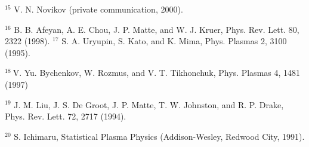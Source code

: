 \documentclass[oneside,onecolumn]{article}
\begin{document}
\begin{sloppypar}
${ }^{15}$ V. N. Novikov (private communication, 2000).

${ }^{16}$ B. B. Afeyan, A. E. Chou, J. P. Matte, and W. J. Kruer, Phys. Rev. Lett. 80, 2322 (1998). ${ }^{17}$ S. A. Uryupin, S. Kato, and K. Mima, Phys. Plasmas 2, 3100 (1995).

${ }^{18} \mathrm{~V}$. Yu. Bychenkov, W. Rozmus, and V. T. Tikhonchuk, Phys. Plasmas 4, 1481 (1997)

${ }^{19}$ J. M. Liu, J. S. De Groot, J. P. Matte, T. W. Johnston, and R. P. Drake, Phys. Rev. Lett. 72, 2717 (1994).

${ }^{20}$ S. Ichimaru, Statistical Plasma Physics (Addison-Wesley, Redwood City, 1991).

  \end{sloppypar}	
  
\end{document}
